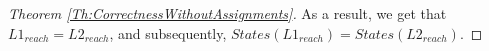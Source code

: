 \documentclass[smallcondensed]{svjour3}
\newcommand{\ERIC}[1]{\textcolor{blue}{#1}}
\begin{document}
\begin{proof}[Theorem \ref{Th:CorrectnessWithoutAssignments}]
As a result, we get that $L1_{reach}=L2_{reach}$, and subsequently, $States(L1_{reach})=States(L2_{reach})$.
%	
%	
%	
%		
%		

\end{proof}
\end{document}
